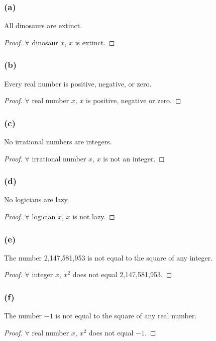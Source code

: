 \documentclass[14pt]{extarticle}
\newcommand{\fa}{\forall}
\begin{document}
\subsubsection{(a)}
All dinosaurs are extinct.

\begin{proof}
    $\fa$ dinosaur $x$, $x$ is extinct.
\end{proof}

\subsubsection{(b)}
Every real number is positive, negative, or zero.

\begin{proof}
    $\fa$ real number $x$, $x$ is positive, negative or zero.
\end{proof}

\subsubsection{(c)}
No irrational numbers are integers.

\begin{proof}
    $\fa$ irrational number $x$, $x$ is not an integer.
\end{proof}

\subsubsection{(d)}
No logicians are lazy.

\begin{proof}
    $\fa$ logician $x$, $x$ is not lazy.
\end{proof}

\subsubsection{(e)}
The number 2,147,581,953 is not equal to the square of any integer.

\begin{proof}
    $\fa$ integer $x$, $x^2$ does not equal 2,147,581,953.
\end{proof}

\subsubsection{(f)}
The number $-1$ is not equal to the square of any real number.

\begin{proof}
    $\fa$ real number $x$, $x^2$ does not equal $-1$.
\end{proof}
\end{document}
